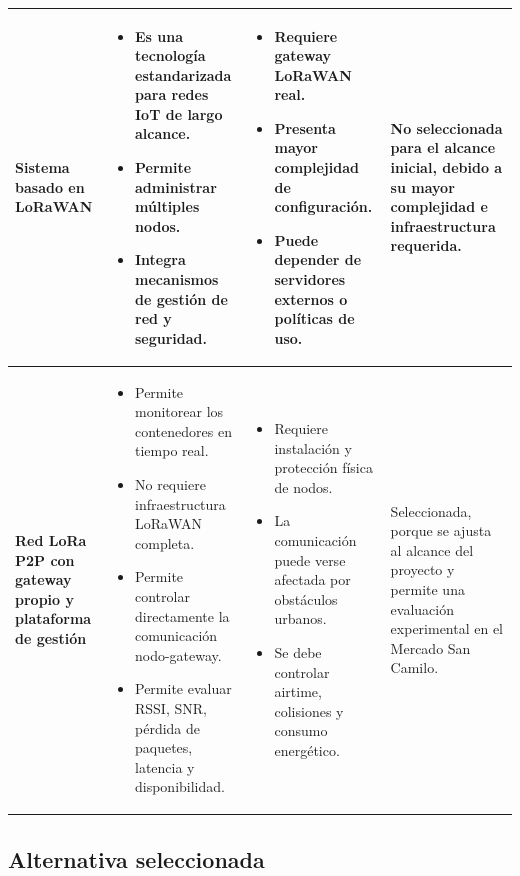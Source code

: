 \begin{xltabular}{\linewidth}{
>{\raggedright\arraybackslash}p{2.8cm}
>{\raggedright\arraybackslash}X
>{\raggedright\arraybackslash}X
>{\raggedright\arraybackslash}p{2.7cm}}
\textbf{Sistema basado en LoRaWAN}
&
\begin{itemize}[leftmargin=*, nosep]
    \item Es una tecnología estandarizada para redes IoT de largo alcance.
    \item Permite administrar múltiples nodos.
    \item Integra mecanismos de gestión de red y seguridad.
\end{itemize}
&
\begin{itemize}[leftmargin=*, nosep]
    \item Requiere gateway LoRaWAN real.
    \item Presenta mayor complejidad de configuración.
    \item Puede depender de servidores externos o políticas de uso.
\end{itemize}
&
No seleccionada para el alcance inicial, debido a su mayor complejidad e infraestructura requerida.
\\
\midrule

\textbf{Red LoRa P2P con gateway propio y plataforma de gestión}
&
\begin{itemize}[leftmargin=*, nosep]
    \item Permite monitorear los contenedores en tiempo real.
    \item No requiere infraestructura LoRaWAN completa.
    \item Permite controlar directamente la comunicación nodo-gateway.
    \item Permite evaluar RSSI, SNR, pérdida de paquetes, latencia y disponibilidad.
\end{itemize}
&
\begin{itemize}[leftmargin=*, nosep]
    \item Requiere instalación y protección física de nodos.
    \item La comunicación puede verse afectada por obstáculos urbanos.
    \item Se debe controlar airtime, colisiones y consumo energético.
\end{itemize}
&
Seleccionada, porque se ajusta al alcance del proyecto y permite una evaluación experimental en el Mercado San Camilo.
\\
\end{xltabular}
\endgroup

\subsection{Alternativa seleccionada}

